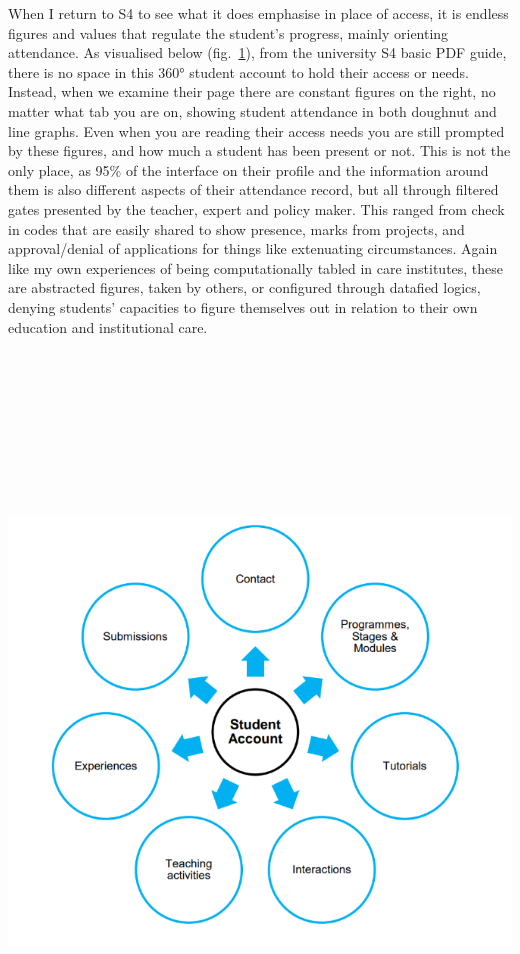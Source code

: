 When I return to S4 to see what it does emphasise in place of access, it
is endless figures and values that regulate the student's progress,
mainly orienting attendance. As visualised below
(fig.~\protect\hyperlink{fig:360}{1}), from the university S4 basic PDF
guide, there is no space in this 360° student account to hold their
access or needs. Instead, when we examine their page there are constant
figures on the right, no matter what tab you are on, showing student
attendance in both doughnut and line graphs. Even when you are reading
their access needs you are still prompted by these figures, and how much
a student has been present or not. This is not the only place, as 95\%
of the interface on their profile and the information around them is
also different aspects of their attendance record, but all through
filtered gates presented by the teacher, expert and policy maker. This
ranged from check in codes that are easily shared to show presence,
marks from projects, and approval/denial of applications for things like
extenuating circumstances. Again like my own experiences of being
computationally tabled in care institutes, these are abstracted figures,
taken by others, or configured through datafied logics, denying
students' capacities to figure themselves out in relation to their own
education and institutional care.

\includegraphics[width=9.23611in,height=7.90278in]{./media_02_Crip-Tic_of_Vignettes/Pictures/0.png}

